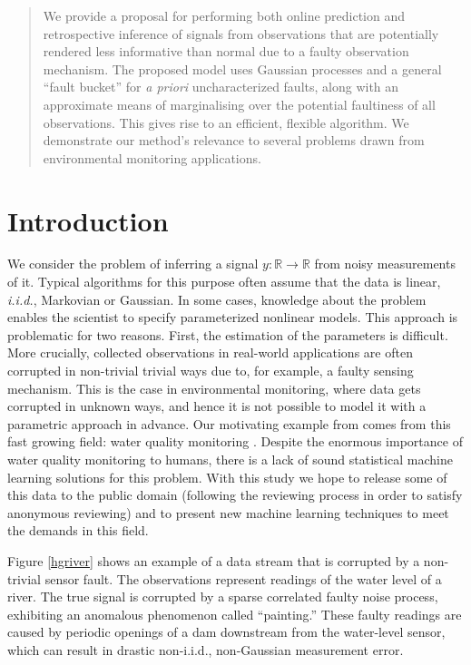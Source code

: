 \documentclass{article}
\newcommand{\R}{\ensuremath{\mathbb{R}}}
\begin{document}

\begin{abstract}
We provide a proposal for performing both online prediction and
retrospective inference of signals from observations that are
potentially rendered less informative than normal due to a faulty
observation mechanism.  The proposed model uses Gaussian processes
and a general ``fault bucket'' for \textit{a priori} uncharacterized
faults, along with an approximate means of marginalising over the potential 
faultiness of all observations. This gives rise to an efficient, flexible algorithm. We demonstrate our method's relevance to several problems drawn from environmental monitoring applications.
\end{abstract}

\section{Introduction}
We consider the problem of inferring a signal $y\colon \R \to \R$ from
noisy measurements of it.  Typical algorithms for this purpose often assume that the data is linear, \emph{i.i.d.}, Markovian or Gaussian. In some cases, knowledge about the problem enables the scientist to specify parameterized nonlinear models. This approach is problematic for two reasons. First, the estimation of the parameters is difficult. More crucially, collected observations in real-world applications are often corrupted in non-trivial trivial ways due
to, for example, a faulty sensing mechanism. This is the case in environmental monitoring, where data gets corrupted in unknown ways, and hence it is not possible to model it with a parametric approach in advance. Our motivating example from comes from this fast growing field:
water quality monitoring \cite{wagner2006guidelines}. Despite the enormous importance of water quality monitoring to humans, there is a lack of sound statistical machine learning solutions for this problem. With this study we hope to release some of this data to the public domain (following the reviewing process in order to satisfy anonymous reviewing) and to present new machine learning techniques to meet the demands in this field.


Figure \ref{hgriver} shows an example of a data stream that is
corrupted by a non-trivial sensor fault.  The observations represent
readings of the water level of a river.  The true signal is corrupted
by a sparse correlated faulty noise process, exhibiting an anomalous
phenomenon called ``painting.''  These faulty readings are caused by
periodic openings of a dam downstream from the water-level sensor,
which can result in drastic non-i.i.d., non-Gaussian measurement
error.
\end{document}
